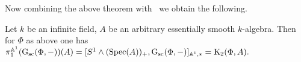 \documentclass[oneside, 11pt]{amsart} \pdfoutput=1
\begin{document}
Now combining the above theorem with~\cite[Theorem~4.3.1]{AHW18} we obtain the following.
\begin{corollary} \label{cor:motivic-pi1} Let $k$ be an infinite field, $A$ be an arbitrary essentially smooth $k$-algebra. Then for $\Phi$ as above one has $\pi_1^{\mathbb{A}^1}(\mathrm{G}_\mathrm{sc}(\Phi, -))(A) = [S^1 \wedge (\mathrm{Spec}(A))_+, \mathrm{G}_\mathrm{sc}(\Phi, -)]_{ \mathbb{A}^1,*} = {\mathrm{K}}_2(\Phi, A).$
\end{corollary}



\printbibliography
\end{document}
